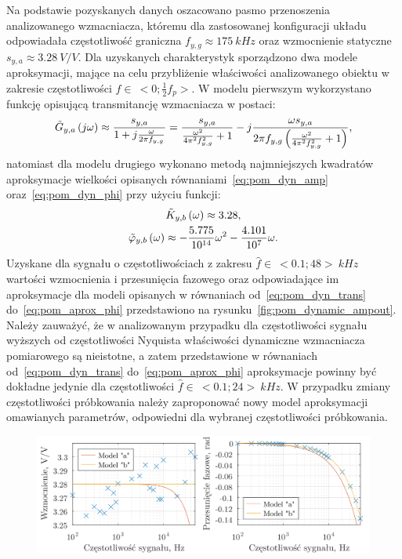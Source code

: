 Na podstawie pozyskanych danych oszacowano pasmo przenoszenia analizowanego wzmacniacza, któremu dla zastosowanej konfiguracji układu odpowiadała częstotliwość graniczna $f_{y,g} \approx \qty{175}{kHz}$ oraz wzmocnienie statyczne $s_{y,a} \approx \qty{3.28}{V \per V}$. Dla uzyskanych charakterystyk sporządzono dwa modele aproksymacji, mające na celu przybliżenie właściwości analizowanego obiektu w zakresie częstotliwości $f \in~<0;\frac{1}{2}f_{p}>$. W modelu pierwszym wykorzystano funkcję opisującą transmitancję wzmacniacza w postaci:
\begin{gather}
\tilde{G}_{y,a} \left(j\omega\right) \approx \frac{s_{y,a}}{1 + j \frac{\omega}{2 \pi f_{y,g}}} = \frac{s_{y,a}}{\frac{\omega^{2}}{4 \pi^{2} f_{y,g}^{2}} + 1} - j \frac{\omega s_{y,a}}{2 \pi f_{y,g} \left( \frac{\omega^{2}}{4 \pi^{2} f_{y,g}^{2}} + 1 \right) } \label{eq:pom_dyn_trans},
\end{gather}
natomiast dla modelu drugiego wykonano metodą najmniejszych kwadratów aproksymacje wielkości opisanych równaniami~\eqref{eq:pom_dyn_amp} oraz~\eqref{eq:pom_dyn_phi} przy użyciu funkcji:
\begin{gather}
\tilde{K}_{y,b} \left(\omega\right) \approx 3.28 \label{eq:pom_aprox_amp}, \\
\tilde{\varphi}_{y,b} \left(\omega\right) \approx -\frac{5.775}{\num{e14}} \omega^{2} - \frac{4.101}{\num{e07}} \omega \label{eq:pom_aprox_phi}.
\end{gather}
Uzyskane dla sygnału o częstotliwościach z zakresu $\hat{f} \in~<0.1; 48>~\unit{kHz}$ wartości wzmocnienia i przesunięcia fazowego oraz odpowiadające im aproksymacje dla modeli opisanych w równaniach od~\eqref{eq:pom_dyn_trans} do~\eqref{eq:pom_aprox_phi} przedstawiono na rysunku~\ref{fig:pom_dynamic_ampout}. Należy zauważyć, że w analizowanym przypadku dla częstotliwości sygnału wyższych od częstotliwości Nyquista właściwości dynamiczne wzmacniacza pomiarowego są nieistotne, a zatem przedstawione w równaniach od~\eqref{eq:pom_dyn_trans} do~\eqref{eq:pom_aprox_phi} aproksymacje powinny być dokładne jedynie dla częstotliwości $\hat{f} \in~<0.1; 24>~\unit{kHz}$. W przypadku zmiany częstotliwości próbkowania należy zaproponować nowy model aproksymacji omawianych parametrów, odpowiedni dla wybranej częstotliwości próbkowania.

\begin{figure}[htb!]
\begin{center}
\includegraphics{obrazki/dynamic_ampout}
\end{center}
\end{figure}

